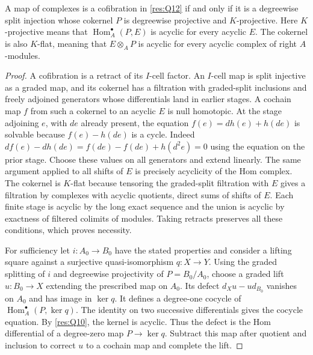\begin{proposition}\label{res:Q13}
A map of complexes is a cofibration in \ref{res:Q12}
if and only if it is a degreewise split injection whose
cokernel \(P\) is degreewise projective and \(K\)-projective.
Here \(K\)-projective means that
\(\operatorname{Hom}_A^\bullet(P,E)\) is acyclic for every
acyclic \(E\). The cokernel is also \(K\)-flat, meaning
that \(E\otimes_A P\) is acyclic for every acyclic complex
of right \(A\)-modules.
\end{proposition}
\begin{proof}
A cofibration is a retract of its \(I\)-cell factor.
An \(I\)-cell map is split injective as a graded map,
and its cokernel has a filtration with graded-split
inclusions and freely adjoined generators whose
differentials land in earlier stages. A cochain map \(f\)
from such a cokernel to an acyclic \(E\) is null homotopic.
At the stage adjoining \(e\), with \(de\) already present,
the equation \(f(e)=d h(e)+h(de)\) is solvable because
\(f(e)-h(de)\) is a cycle. Indeed
\(d f(e)-d h(de)=f(de)-f(de)+h(d^2e)=0\)
using the equation on the prior stage. Choose these values
on all generators and extend linearly. The same argument
applied to all shifts of \(E\) is precisely acyclicity
of the Hom complex. The cokernel is \(K\)-flat because
tensoring the graded-split filtration with \(E\) gives
a filtration by complexes with acyclic quotients, direct
sums of shifts of \(E\). Each finite stage is acyclic
by the long exact sequence and the union is acyclic
by exactness of filtered colimits of modules. Taking
retracts preserves all these conditions, which proves
necessity.

For sufficiency let \(i:A_0\to B_0\) have the stated
properties and consider a lifting square against a
surjective quasi-isomorphism \(q:X\to Y\). Using the
graded splitting of \(i\) and degreewise projectivity
of \(P=B_0/A_0\), choose a graded lift \(u:B_0\to X\)
extending the prescribed map on \(A_0\).
Its defect \(d_Xu-u d_{B_0}\) vanishes on \(A_0\)
and has image in \(\ker q\). It defines a degree-one
cocycle of \(\operatorname{Hom}_A^\bullet(P,\ker q)\).
The identity on two successive differentials gives the
cocycle equation. By \ref{res:Q10}, the kernel is
acyclic. Thus the defect is the Hom differential of
a degree-zero map \(P\to\ker q\). Subtract this
map after quotient and inclusion to correct \(u\)
to a cochain map and complete the lift.
\end{proof}

